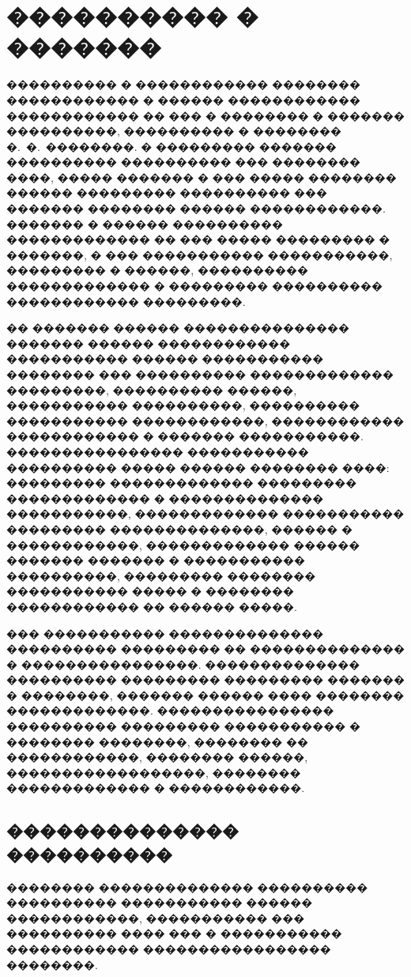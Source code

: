 \section{���������� � �������}

���������� � ������������ �������� ������������ � ������ ������������ ������������ �� ��� � �������� � ������� ����������, ���������� � �������� �.~�.~��������\cite{metodichka_vkr_ikt_2021,kulikov_testing_2024}. � ��������� ������� ���������� ���������� ��� �������� ����, ����� ������� � ��� ����� �������� ������ ��������� ���������� ��� ������� �������� ������ ������������. ������� � ������ ���������� ������������� �� ��� ����� ��������� � �������, � ��� ����������� �����������, ��������� � ������, ���������� ������������� � ��������� ���������� ������������ ���������.

�� ������� ������ ��������������� ������� ������ ������������ ����������� ������ ����������� �������� ��� ���������� ������������� ���������, ���������� ������, ����������� ����������, ���������� ����������� ������������, ������������ ������������ � ������� �����������. ���������������� ����������� ���������� ����� ������ �������� ����: ��������� ������������� ��������� ������������� � �������������� �����������, ������������� ����������� ��������� ��������������, ������ � ������������, ������������� ������ ������� ������� � ����������� ����������, ��������� �������� ����������� ����� � �������� ������������ �� ������ �����.

��� ����������� �������������� ���������� ��������� �� �������������� � ����������������. �������������� ���������� ��������� ��������� ������� � ��������, ������� ������ ���� �������� �������������. ���������������� ���������� ��������� ����������� � �������� ��������, �������� �� ������������, �������� ������, ������������������, �������� ������������� � ������������.

\subsection{�������������� ����������}

�������� �������������� ���������� ���������� ����������� ������ ������������, ����������� ��� ���������� ���� ��� � ����������� ������������ ����������������� ��������.


